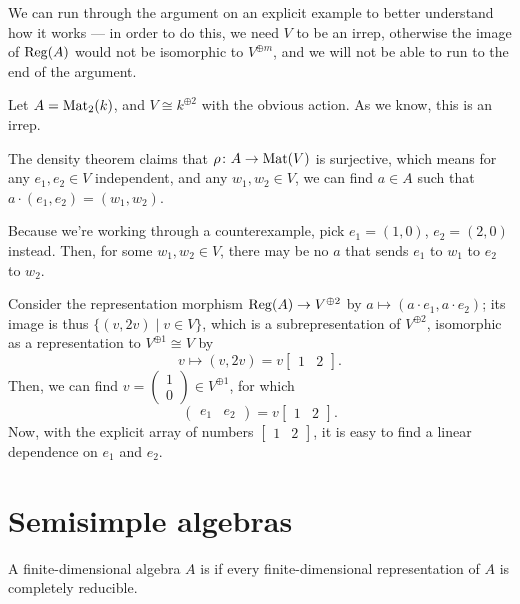 \begin{example}
	We can run through the argument on an explicit example to better understand
	how it works --- in order to do this, we need $V$ to be an irrep,
	otherwise the image of $\operatorname{Reg}(A)$ would not be isomorphic to $V^{\oplus m}$,
	and we will not be able to run to the end of the argument.

	Let $A=\mathrm{Mat}_2(k)$, and $V \cong k^{\oplus 2}$ with the obvious action.
	As we know, this is an irrep.

	The density theorem claims that $\rho \colon A \to \mathrm{Mat}(V)$ is surjective, which
	means for any $e_1, e_2 \in V$ independent, and any $w_1, w_2 \in V$, we can
	find $a \in A$ such that $a \cdot (e_1, e_2) = (w_1, w_2)$.

	Because we're working through a counterexample, pick $e_1=(1, 0)$, $e_2=(2, 0)$ instead.
	Then, for some $w_1, w_2 \in V$,
	there may be no $a$ that sends $e_1$ to $w_1$ to $e_2$ to $w_2$.

	Consider the representation morphism $\operatorname{Reg}(A) \to V^{\oplus 2}$ by
	$a \mapsto(a \cdot e_1, a \cdot e_2)$;
	its image is thus $\{(v, 2v) \mid v \in V \}$,
	which is a subrepresentation of $V^{\oplus 2}$,
	isomorphic as a representation to $V^{\oplus 1}\cong V$ by
	\[ v \mapsto(v, 2v) = v \begin{bmatrix} 1 & 2 \end{bmatrix}. \]
	Then, we can find $v=\begin{pmatrix}1 \\ 0\end{pmatrix}\in V^{\oplus 1}$,
	for which
	\[ \begin{pmatrix} e_1 & e_2 \end{pmatrix} = v \begin{bmatrix} 1 & 2 \end{bmatrix}. \]
	Now, with the explicit array of numbers $\begin{bmatrix} 1 & 2 \end{bmatrix}$,
	it is easy to find a linear dependence on $e_1$ and $e_2$.
\end{example}

\section{Semisimple algebras}
\begin{definition}
	A finite-dimensional algebra $A$ is 
	if every finite-dimensional representation of $A$ is completely reducible.
\end{definition}

